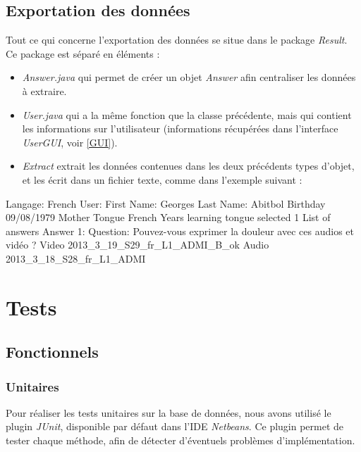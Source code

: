 \subsection{Exportation des données}\label{export}

Tout ce qui concerne l'exportation des données se situe dans le package \textit{Result}. Ce package est séparé en 
 éléments :
 
 \begin{itemize}
  \item \textit{Answer.java} qui permet de créer un objet \textit{Answer} afin centraliser les données à extraire.
  \item \textit{User.java} qui a la même fonction que la classe précédente, mais qui contient les informations sur l'utilisateur (informations récupérées dans l'interface \textit{UserGUI}, voir \ref{GUI}).
  \item \textit{Extract} extrait les données contenues dans les deux précédents types d'objet, et les écrit dans un fichier texte, comme dans l'exemple suivant :
 \end{itemize}
 
 \begin{verbnobox}[\small]
  Langage:   French
  User:
      First Name:   Georges
      Last Name:   Abitbol
      Birthday   09/08/1979
      Mother Tongue   French
      Years learning tongue selected   1
  List of answers
      Answer 1:
	    Question:   Pouvez-vous exprimer la douleur avec ces audios et vidéo ?
	    Video   2013_3_19_S29_fr_L1_ADMI_B_ok
	    Audio   2013_3_18_S28_fr_L1_ADMI

 \end{verbnobox}



\section{Tests}\label{tests}

\subsection{Fonctionnels}

\subsubsection{Unitaires}

Pour réaliser les tests unitaires sur la base de données, nous avons utilisé le plugin \textit{JUnit}, disponible par défaut dans l'IDE \textit{Netbeans}.
Ce plugin permet de tester chaque méthode, afin de détecter d'éventuels problèmes d'implémentation.

